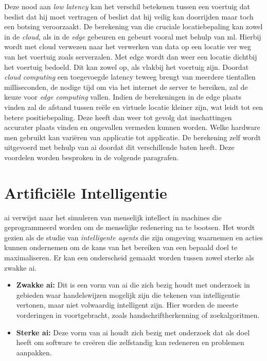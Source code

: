 Deze nood aan \textit{low latency} kan het verschil betekenen tussen een voertuig dat beslist dat hij moet vertragen of beslist dat hij veilig kan doorrijden maar toch een botsing veroorzaakt. De berekening van die cruciale locatiebepaling kan zowel in de \textit{cloud}, als in de \textit{edge}\cite{edgecomputingLi} gebeuren en gebeurt vooral met behulp van \gls{ml}. Hierbij wordt met cloud verwezen naar het verwerken van data op een locatie ver weg van het voertuig zoals serverzalen. Met edge wordt dan weer een locatie dichtbij het voertuig bedoeld. Dit kan zowel op, als vlakbij het voertuig zijn. Doordat \textit{cloud computing} een toegevoegde latency teweeg brengt van meerdere tientallen milliseconden, de nodige tijd om via het internet de server te bereiken, zal de keuze voor \textit{edge computing} vallen. Indien de berekeningen in de edge plaats vinden zal de afstand tussen re\"ele en virtuele locatie kleiner zijn, wat leidt tot een betere positiebepaling. Deze heeft dan weer tot gevolg dat inschattingen accurater plaats vinden en ongevallen vermeden kunnen worden. Welke hardware men gebruikt kan vari\"eren van applicatie tot applicatie. De berekening zelf wordt uitgevoerd met behulp van \gls{ai} doordat dit verschillende baten heeft. Deze voordelen worden besproken in de volgende paragrafen.



\newpage

\section{Artifici\"ele Intelligentie}
\gls{ai} verwijst naar het simuleren van menselijk intellect in machines die geprogrammeerd worden om de menselijke redenering na te bootsen. Het wordt gezien als de studie van \textit{intelligente agents} die zijn omgeving waarnemen en acties kunnen ondernemen om de kans van het bereiken van een bepaald doel te maximaliseren\cite{poole1998computational}. Er kan een onderscheid gemaakt worden tussen zowel sterke als zwakke \gls{ai}.
\begin{itemize}
	\item \textbf{Zwakke \gls{ai}:} Dit is een vorm van \gls{ai} die zich bezig houdt met onderzoek in gebieden waar handelswijzen mogelijk zijn die tekenen van intelligentie vertonen, maar niet volwaardig intelligent zijn. Hier worden de meeste vorderingen in voortgebracht, zoals handschriftherkenning of zoekalgoritmen.
	\item \textbf{Sterke \gls{ai}:} Deze vorm van \gls{ai} houdt zich bezig met onderzoek dat als doel heeft om software te cre\"eren die zelfstandig kan redeneren en problemen aanpakken.
\end{itemize}

